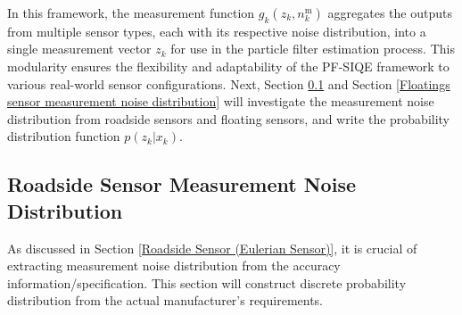 In this framework, the measurement function $g_k(z_k, n_k^\text{m})$ aggregates the outputs from multiple sensor types, each with its respective noise distribution, into a single measurement vector $z_k$ for use in the particle filter estimation process. This modularity ensures the flexibility and adaptability of the PF-SIQE framework to various real-world sensor configurations. Next, Section \ref{Roadside sensor measurement noise distribution} and Section \ref{Floatings sensor measurement noise distribution} will investigate the measurement noise distribution from roadside sensors and floating sensors, and write the probability distribution function $p(z_k | x_k)$.

\subsection{Roadside Sensor Measurement Noise Distribution}\label{Roadside sensor measurement noise distribution}
As discussed in Section \ref{Roadside Sensor (Eulerian Sensor)}, it is crucial of extracting measurement noise distribution from the accuracy information/specification. This section will construct discrete probability distribution from the actual manufacturer's requirements. 



